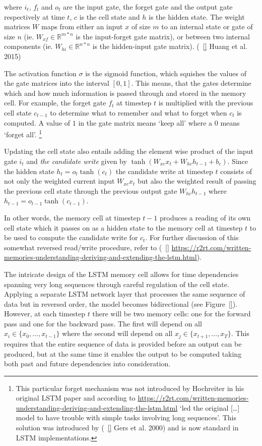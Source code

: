 where $i_{t}$, $f_{t}$ and $o_{t}$ are the input gate, the forget gate and the
output gate respectively at time $t$, $c$ is the cell state and $h$ is the
hidden state. The weight matrices $W$ maps from either an input $x$ of size $m$
to an internal state or gate of size $n$ (ie. $W_{xf} \in \mathbb{R}^{m*n}$ is the
input-forget gate matrix), or between two internal components (ie. $W_{hi} \in
\mathbb{R}^{n*n}$ is the hidden-input gate matrix). (~\ref{} Huang et al. 2015)

The activation function $\sigma$ is the sigmoid function, which squishes the
values of the gate matrices into the interval $[0,1]$. This means, that the
gates determine which and how much information is passed through and stored in
the memory cell. For example, the forget gate $f_{t}$ at timestep $t$ is 
multiplied with the previous cell state $c_{t-1}$ to determine what to remember
and what to forget when $c_{t}$ is computed. A value of $1$ in the gate matrix
means `keep all' where a $0$ means `forget all'.
\footnote{This particular forget mechanism was not
    introduced by Hochreiter in his original LSTM paper and according to
    \url{https://r2rt.com/written-memories-understanding-deriving-and-extending-the-lstm.html}
    `led the original [\ldots] model to have trouble with simple tasks involving
    long sequences'. This solution was introduced by (~\ref{} Gers et al. 2000)
and is now standard in LSTM implementations.}

Updating the cell state also entails adding the element wise product of the
input gate $i_{t}$ and \textit{the candidate write} given by $\tanh(W_{xc}x_{t}
+ W_{hc}h_{t-1} + b_{c})$. Since the hidden state $h_{t} = o_{t}\tanh(c_{t})$
the candidate write at timestep $t$ consists of not only the weighted current
input $W_{xc}x_{t}$ but also the weighted result of passing the previous cell
state through the previous output gate $W_{hc}h_{t-1}$ where $h_{t-1} =
o_{t-1}\tanh(c_{t-1})$.

In other words, the memory cell at timestep $t-1$ produces a reading of its own
cell state which it passes on as a hidden state to the memory cell at timestep
$t$ to be used to compute the candidate write for $c_{t}$. For further
discussion of this somewhat reversed read/write procedure, refer to (~\ref{}
\url{https://r2rt.com/written-memories-understanding-deriving-and-extending-the-lstm.html}).

The intricate design of the LSTM memory cell allows for time dependencies
spanning very long sequences through careful regulation of the cell state.
Applying a separate LSTM network layer that processes the same sequence of data
but in reversed order, the model becomes bidirectional (see Figure~\ref{}).
However, at each timestep $t$ there will be two memory cells: one for the
forward pass and one for the backward pass. The first will depend on all $x_{i}
\in \{x_{0}, \ldots, x_{t-1}\}$ where the second will depend on all $x_{j} \in
\{x_{t+1}, \ldots, x_{T}\}$. This requires that the entire sequence of data is
provided before an output can be produced, but at the same time it enables the
output to be computed taking both past and future dependencies into
consideration.


